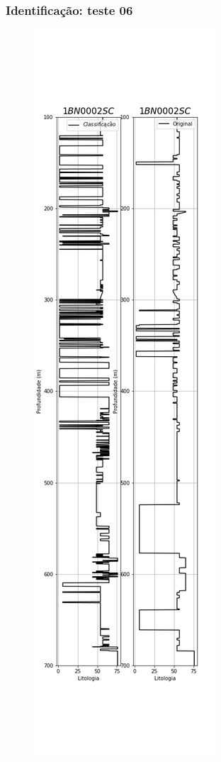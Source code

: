 \documentclass[aspectratio=10]{beamer} %
\begin{document}
\begin{frame}
	\frametitle{Identificação: teste 06}
	\begin{figure}[H]
		\centering
		\includegraphics[scale=0.18]{Imagens/result06.png}
	\end{figure} 
\end{frame}
\end{document}
